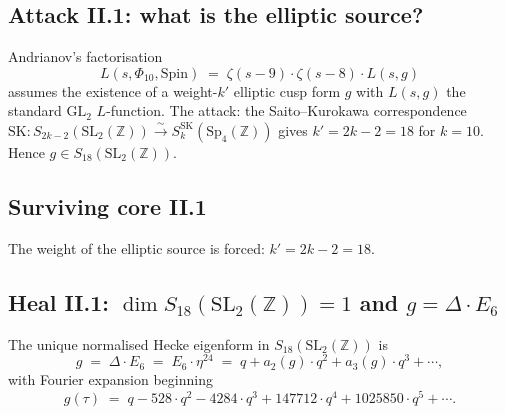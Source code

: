 \subsection*{Attack II.1: what is the elliptic source?}

Andrianov's factorisation
\[
 L(s, \Phi_{10}, \mathrm{Spin}) \;=\; \zeta(s - 9) \cdot \zeta(s - 8)
 \cdot L(s, g)
\]
assumes the existence of a weight-$k'$ elliptic cusp form $g$ with
$L(s, g)$ the standard $\mathrm{GL}_2$ $L$-function.  The attack: the
Saito--Kurokawa correspondence $\mathrm{SK} \colon S_{2k - 2}
(\mathrm{SL}_2(\mathbb{Z})) \xrightarrow{\sim} S_k^{\mathrm{SK}}(\mathrm{Sp}_4(\mathbb{Z}))$
gives $k' = 2k - 2 = 18$ for $k = 10$.  Hence $g \in S_{18}
(\mathrm{SL}_2(\mathbb{Z}))$.

\subsection*{Surviving core II.1}

The weight of the elliptic source is forced: $k' = 2k - 2 = 18$.

\subsection*{Heal II.1: $\dim S_{18}(\mathrm{SL}_2(\mathbb{Z})) = 1$
and $g = \Delta \cdot E_6$}
\label{subsec:heal-II-1-g-identification}

\begin{lemma}
\label{lem:heal-II-1-g-forced}
The unique normalised Hecke eigenform in $S_{18}(\mathrm{SL}_2(\mathbb{Z}))$
is
\[
 g \;=\; \Delta \cdot E_6 \;=\; E_6 \cdot \eta^{24} \;=\; q + a_2(g) \cdot
 q^2 + a_3(g) \cdot q^3 + \cdots,
\]
with Fourier expansion beginning
\[
 g(\tau) \;=\; q - 528 \cdot q^2 - 4284 \cdot q^3 + 147712 \cdot q^4
 + 1025850 \cdot q^5 + \cdots.
\]
\end{lemma}

